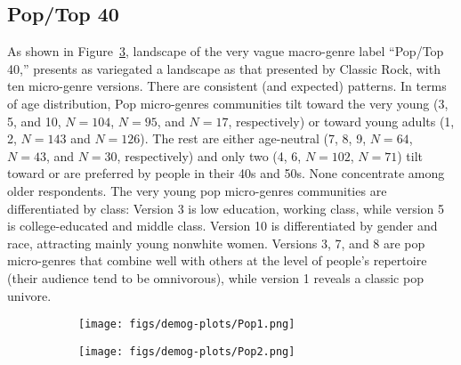 \subsection{Pop/Top 40}
As shown in Figure~\ref{fig:Pop}, landscape of the very vague macro-genre label ``Pop/Top 40,'' presents as variegated a landscape as that presented by Classic Rock, with ten micro-genre versions. There are consistent (and expected) patterns. In terms of age distribution, Pop micro-genres communities tilt toward the very young (3, 5, and 10, $N=104$, $N=95$, and $N=17$, respectively) or toward young adults (1, 2, $N=143$ and $N=126$). The rest are either age-neutral (7, 8, 9, $N=64$, $N=43$, and $N=30$, respectively) and only two  (4, 6, $N=102$, $N=71$) tilt toward or are preferred by people in their 40s and 50s. None concentrate among older respondents. The very young pop micro-genres communities are differentiated by class: Version 3 is low education, working class, while version 5 is college-educated and middle class. Version 10 is differentiated by gender and race, attracting mainly young nonwhite women. Versions 3, 7, and 8 are pop micro-genres that combine well with others at the level of people's repertoire (their audience tend to be omnivorous), while version 1 reveals a classic pop univore. 
 
  \begin{figure}[ht!]
      \centering
     \begin{subfigure}[b]{0.8\textwidth}
        \texttt{[image: figs/demog-plots/Pop1.png]}
        \caption{}
        \label{fig:Pop1}
    \end{subfigure} 
     \begin{subfigure}[b]{0.8\textwidth}
        \texttt{[image: figs/demog-plots/Pop2.png]}
        \caption{}
        \label{fig:Pop2}
    \end{subfigure}
     \caption{}
  \label{fig:Pop}
 \end{figure}
 
